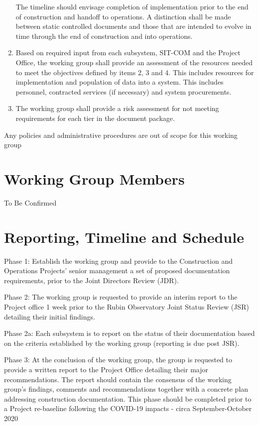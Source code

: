 \documentclass[SE,authoryear,toc]{lsstdoc}
\begin{document}
\begin{enumerate}
{The timeline should envisage completion  of implementation prior to the end of construction and handoff to operations.
A distinction shall be made between static controlled documents and those that are intended to evolve in time through the end of construction and into operations. }
\item {Based on required input from each subsystem, SIT-COM and the Project Office, the working group shall provide an assessment of the resources needed to meet the objectives defined by items 2, 3 and 4.
This includes resources for implementation and population of data into a system.
This includes personnel, contracted services (if necessary) and system procurements.}
\item{The working group shall provide a risk assessment for not meeting requirements for each tier in the document package.}
\end{enumerate}

Any policies and administrative  procedures are out of scope for this working group

\section{Working Group Members}

To Be Confirmed

\section{Reporting, Timeline and Schedule}
Phase 1: Establish the working group and provide to the Construction and Operations Projects' senior management a set of proposed documentation requirements, prior to the Joint Directors Review (JDR).

Phase 2: The working group is requested to provide an interim report to the Project office 1 week prior to the Rubin Observatory Joint Status Review (JSR) detailing their initial findings. 

Phase 2a:  Each subsystem is to report on the status of their documentation based on the criteria established by the working group (reporting is due post JSR).

Phase 3: At the conclusion of the working group,  the group is requested to provide a written report to the Project Office detailing their major recommendations.  The report
should contain the consensus of the working group's findings, comments and recommendations together with a concrete plan addressing construction documentation.  This phase should be completed prior to a Project re-baseline following the COVID-19 impacts - circa September-October 2020
\end{document}
